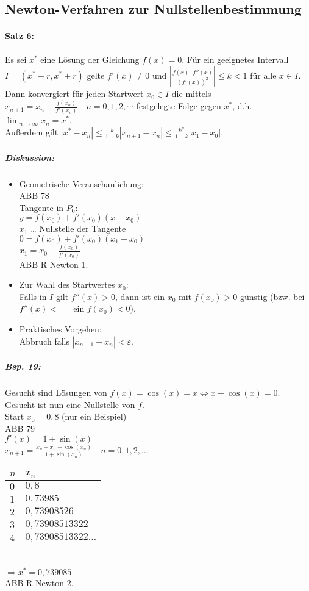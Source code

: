 \subsection{Newton-Verfahren zur Nullstellenbestimmung}
\paragraph{Satz 6:} Es sei $x^*$ eine Lösung der Gleichung $f(x)=0$. Für ein geeignetes Intervall $I=(x^*-r, x^*+r)$ gelte $f'(x)\not = 0$ und $\left|\frac{f(x)\cdot f''(x)}{(f'(x))^2}\right|\leq k < 1$ für alle $x \in I$.\\
Dann konvergiert für jeden Startwert $x_0\in I$ die mittels $x_{n+1}=x_n-\frac{f(x_n)}{f'(x_n)} \quad n=0,1,2,\cdots$ festgelegte Folge gegen $x^*$, d.h. $\lim_{n\to\infty}x_n=x^*$.\\
Außerdem gilt $|x^*-x_n|\leq \frac{k}{1-k}|x_{n+1}-x_n|\leq \frac{k^n}{1-k}|x_1-x_0|$.
\subparagraph{Diskussion:} 
\begin{itemize}
\item Geometrische Veranschaulichung:\\
ABB 78\\
Tangente in $P_0:$\\
$y=f(x_0)+f'(x_0)(x-x_0)$\\
$x_1$ … Nullstelle der Tangente\\
$0=f(x_0)+f'(x_0)(x_1-x_0)$\\
$x_1 = x_0-\frac{f(x_0)}{f'(x_0)}$\\
ABB R Newton 1.
\item Zur Wahl des Startwertes $x_0$:\\
Falls in $I$ gilt $f''(x)>0$, dann ist ein $x_0$ mit $f(x_0)>0$ günstig (bzw. bei $f''(x)<=$ ein $f(x_0)<0$).
\item Praktisches Vorgehen:\\
Abbruch falls $|x_{n+1}-x_n|<\varepsilon$.
\end{itemize}
\subparagraph{Bsp. 19:} Gesucht sind Lösungen von $f(x)=\cos (x)=x \Leftrightarrow x-\cos(x)=0$. Gesucht ist nun eine Nullstelle von $f$.\\
Start $x_0=0,8$ (nur ein Beispiel)\\
ABB 79\\
$f'(x)=1+\sin(x)$\\
$x_{n+1}=\frac{x_n-x_n-\cos(x_n)}{1+\sin(x_n)} \quad n=0,1,2, \dots$\\
\begin{tabular}{l | l}
$n$ & $x_n$\\
\hline 
$0$ & $0,8$\\
$1$ & $0,73985$\\
$2$ & $0,73908526$\\
$3$ & $0,73908513322$\\
$4$ & $0,73908513322\dots$\\
\end{tabular}\\
$\Rightarrow x^*=0,739085$\\
ABB R Newton 2. 

